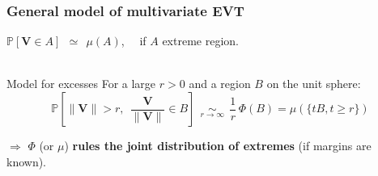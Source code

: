 \documentclass[9pt]{beamer}
\def\mb{\mathbf}
\begin{document}
\begin{frame}
\frametitle{General model of multivariate EVT}
%
$\mathbb{P} [\mb V \in A]~~\simeq~~\mu(A)$, ~~if $A$ extreme region.\\~\\

\begin{block}{ { Model} for excesses }
For a large $r>0$ and a region $B$ on the unit sphere: $$ \mathbb{P}\left[\|\mb V\|> r  ,~~\mb{\frac{V}{\|V\|}} \in B \right]  ~~\underset{r \to \infty}{\sim}~~  \frac{1}{r}\,\Phi(B)  = \mu(\{t B, t\ge r\})$$
\end{block}
\vspace*{.5cm}
$\Rightarrow$ $\Phi$ (or $\mu$) \textbf{rules the joint distribution of extremes} (if margins are known).
\end{frame}
\end{document}
